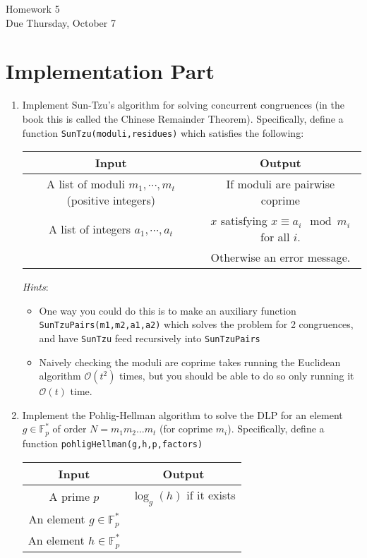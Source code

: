 \documentclass[11pt]{article}
\newcommand{\bF}{\mathbb{F}}
\newcommand{\cO}{\mathcal{O}}
\begin{document}
\begin{center}
\Large {Homework 5}\\
\small {Due Thursday, October 7}
\end{center}
\section*{Implementation Part}
\begin{enumerate}
  \item{
  Implement Sun-Tzu's algorithm for solving concurrent congruences (in the book this is called the Chinese Remainder Theorem).  Specifically, define a function \verb|SunTzu(moduli,residues)| which satisfies the following:
  \begin{center}
    \begin{tabular}{c|c}
      Input & Output\\
      \hline
      A list of moduli $m_1,\cdots,m_t$ (positive integers) & If moduli are pairwise coprime\\
      A list of integers $a_1,\cdots,a_t$ &$x$ satisfying $x\equiv a_i\mod m_i$ for all $i$.\\
      &Otherwise an error message.
    \end{tabular}
  \end{center}
  \textit{Hints}:
  \begin{itemize}
    \item{One way you could do this is to make an auxiliary function \verb|SunTzuPairs(m1,m2,a1,a2)| which solves the problem for 2 congruences, and have \verb|SunTzu| feed recursively into \verb|SunTzuPairs|}
    \item{
    Naively checking the moduli are coprime takes running the Euclidean algorithm $\cO(t^2)$ times, but you should be able to do so only running it $\cO(t)$ time.
    }
  \end{itemize}
  }
  \item{
  Implement the Pohlig-Hellman algorithm to solve the DLP for an element $g\in\bF_p^*$ of order $N = m_1m_2...m_t$ (for coprime $m_i$).  Specifically, define a function \verb|pohligHellman(g,h,p,factors)|
  \begin{center}
    \begin{tabular}{c|c}
      Input & Output\\
      \hline
      A prime $p$ & $\log_g(h)$ if it exists\\
      An element $g\in\bF_p^*$ & \\
      An element $h\in\bF_p^*$ & \\

\end{tabular}
\end{center}}
\end{enumerate}
\end{document}
